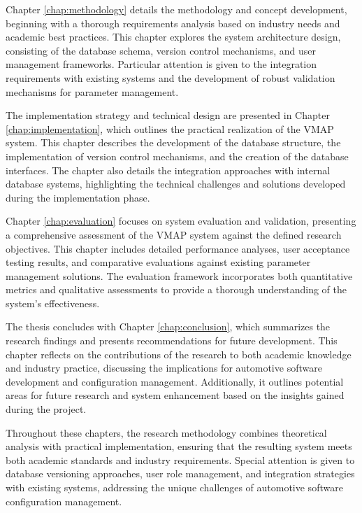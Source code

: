 Chapter \ref{chap:methodology} details the methodology and concept development, beginning with a thorough requirements analysis based on industry needs and academic best practices. This chapter explores the system architecture design, consisting of the database schema, version control mechanisms, and user management frameworks. Particular attention is given to the integration requirements with existing systems and the development of robust validation mechanisms for parameter management.

The implementation strategy and technical design are presented in Chapter \ref{chap:implementation}, which outlines the practical realization of the \ac{VMAP} system. This chapter describes the development of the database structure, the implementation of version control mechanisms, and the creation of the database interfaces. The chapter also details the integration approaches with internal database systems, highlighting the technical challenges and solutions developed during the implementation phase.

Chapter \ref{chap:evaluation} focuses on system evaluation and validation, presenting a comprehensive assessment of the \ac{VMAP} system against the defined research objectives. This chapter includes detailed performance analyses, user acceptance testing results, and comparative evaluations against existing parameter management solutions. The evaluation framework incorporates both quantitative metrics and qualitative assessments to provide a thorough understanding of the system's effectiveness.

The thesis concludes with Chapter \ref{chap:conclusion}, which summarizes the research findings and presents recommendations for future development. This chapter reflects on the contributions of the research to both academic knowledge and industry practice, discussing the implications for automotive software development and configuration management. Additionally, it outlines potential areas for future research and system enhancement based on the insights gained during the project.

Throughout these chapters, the research methodology combines theoretical analysis with practical implementation, ensuring that the resulting system meets both academic standards and industry requirements. Special attention is given to database versioning approaches, user role management, and integration strategies with existing systems, addressing the unique challenges of automotive software configuration management.
